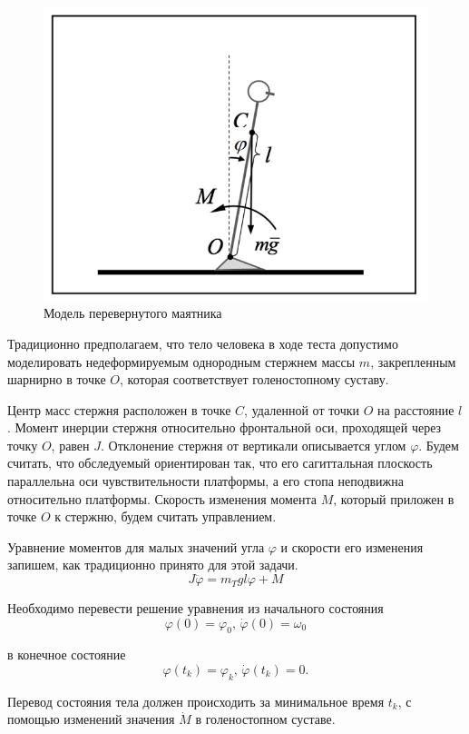 \documentclass[a4paper,14pt]{article}
\theoremstyle{plain} %
\theoremstyle{definition} %
\theoremstyle{remark} %
\begin{document}
{\begin{figure}[h!]
    \centering
    \includegraphics[width=1.00\linewidth]{pendulum.png}
    \caption{Модель перевернутого маятника}
    \label{fig:pendulum}
\end{figure}

Традиционно предполагаем, что тело человека в ходе теста допустимо
моделировать недеформируемым однородным стержнем массы $m$,
закрепленным шарнирно в точке $O$, которая соответствует
голеностопному суставу.

Центр масс стержня расположен в точке $C$, удаленной от точки $O$
на расстояние $l$. Момент инерции стержня относительно фронтальной
оси, проходящей через точку $O$, равен $J$. Отклонение стержня от
вертикали описывается углом $\varphi$. Будем считать, что обследуемый
ориентирован так, что его сагиттальная плоскость параллельна оси
чувствительности платформы, а его стопа неподвижна относительно
платформы. Скорость изменения момента $M$, который приложен в точке $O$ к стержню,
будем считать управлением.

Уравнение моментов для малых значений угла $\varphi$ и
скорости его изменения запишем, как традиционно принято для этой задачи.
\[
    J\ddot{\varphi}= m_Tgl\varphi+M
\]

Необходимо перевести решение уравнения из начального состояния
\[
    \varphi(0)=\varphi_0, \,\dot{\varphi}(0)=\omega_0
\]

в конечное состояние
\[
    \varphi(t_k)=\varphi_k,\, \dot{\varphi}(t_k)=0.
\]

Перевод состояния тела должен происходить за минимальное
время $t_k$, с помощью изменений значения $\dot{M}$ в
голеностопном суставе.

}
\end{document}
